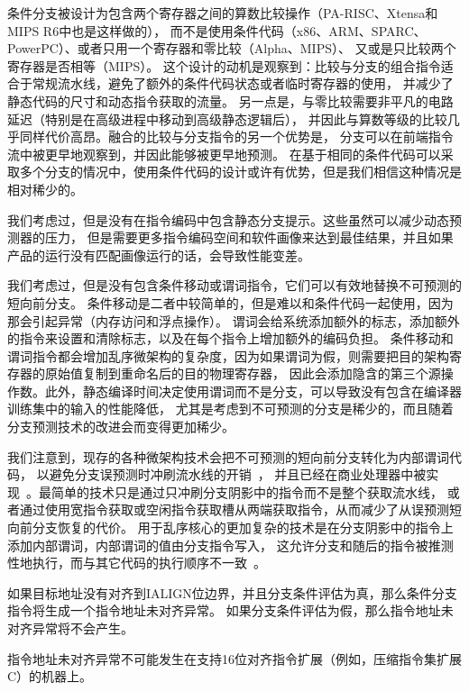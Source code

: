 \begin{commentary} 
条件分支被设计为包含两个寄存器之间的算数比较操作（PA-RISC、Xtensa和MIPS R6中也是这样做的），
而不是使用条件代码（x86、ARM、SPARC、PowerPC）、或者只用一个寄存器和零比较（Alpha、MIPS）、
又或是只比较两个寄存器是否相等（MIPS）。
这个设计的动机是观察到：比较与分支的组合指令适合于常规流水线，避免了额外的条件代码状态或者临时寄存器的使用，
并减少了静态代码的尺寸和动态指令获取的流量。
另一点是，与零比较需要非平凡的电路延迟（特别是在高级进程中移动到高级静态逻辑后），
并因此与算数等级的比较几乎同样代价高昂。融合的比较与分支指令的另一个优势是，
分支可以在前端指令流中被更早地观察到，并因此能够被更早地预测。
在基于相同的条件代码可以采取多个分支的情况中，使用条件代码的设计或许有优势，但是我们相信这种情况是相对稀少的。

我们考虑过，但是没有在指令编码中包含静态分支提示。这些虽然可以减少动态预测器的压力，
但是需要更多指令编码空间和软件画像来达到最佳结果，并且如果产品的运行没有匹配画像运行的话，会导致性能变差。

我们考虑过，但是没有包含条件移动或谓词指令，它们可以有效地替换不可预测的短向前分支。
条件移动是二者中较简单的，但是难以和条件代码一起使用，因为那会引起异常（内存访问和浮点操作）。
谓词会给系统添加额外的标志，添加额外的指令来设置和清除标志，以及在每个指令上增加额外的编码负担。
条件移动和谓词指令都会增加乱序微架构的复杂度，因为如果谓词为假，则需要把目的架构寄存器的原始值复制到重命名后的目的物理寄存器，
因此会添加隐含的第三个源操作数。此外，静态编译时间决定使用谓词而不是分支，可以导致没有包含在编译器训练集中的输入的性能降低，
尤其是考虑到不可预测的分支是稀少的，而且随着分支预测技术的改进会而变得更加稀少。

我们注意到，现存的各种微架构技术会把不可预测的短向前分支转化为内部谓词代码，
以避免分支误预测时冲刷流水线的开销~\cite{heil-tr1996,Klauser-1998,Kim-micro2005}，
并且已经在商业处理器中被实现~\cite{ibmpower7}。最简单的技术只是通过只冲刷分支阴影中的指令而不是整个获取流水线，
或者通过使用宽指令获取或空闲指令获取槽从两端获取指令，从而减少了从误预测短向前分支恢复的代价。
用于乱序核心的更加复杂的技术是在分支阴影中的指令上添加内部谓词，内部谓词的值由分支指令写入，
这允许分支和随后的指令被推测性地执行，而与其它代码的执行顺序不一致~\cite{ibmpower7}。
\end{commentary}

如果目标地址没有对齐到IALIGN位边界，并且分支条件评估为真，那么条件分支指令将生成一个指令地址未对齐异常。
如果分支条件评估为假，那么指令地址未对齐异常将不会产生。

\begin{commentary}
指令地址未对齐异常不可能发生在支持16位对齐指令扩展（例如，压缩指令集扩展C）的机器上。
\end{commentary}

